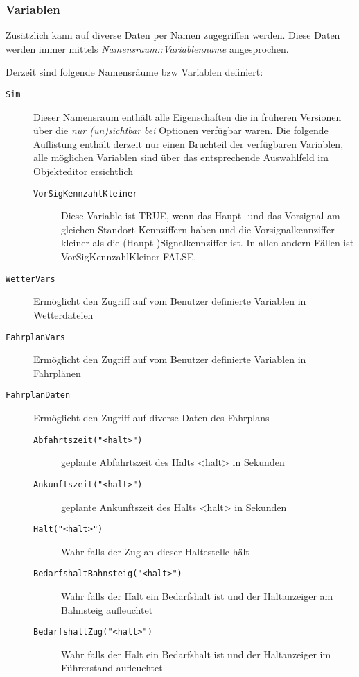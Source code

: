 \subsubsection{Variablen}
\label{sec:editor-obj-logischeausdruecke-vars}

Zusätzlich kann auf diverse Daten per Namen zugegriffen werden. Diese
Daten werden immer mittels \emph{Namensraum::Variablenname}
angesprochen.

Derzeit sind folgende Namensräume bzw Variablen definiert:

\begin{description}
\item[\texttt{Sim}]
Dieser Namensraum enthält alle Eigenschaften die in früheren Versionen über die \emph{nur (un)sichtbar bei} Optionen verfügbar waren.
Die folgende Auflistung enthält derzeit nur einen Bruchteil der verfügbaren Variablen, alle möglichen Variablen sind über das entsprechende Auswahlfeld im Objekteditor ersichtlich
\begin{description}
\item[\texttt{VorSigKennzahlKleiner}]
Diese Variable ist TRUE, wenn das Haupt- und das Vorsignal am gleichen Standort Kennziffern haben und die Vorsignalkennziffer kleiner als die (Haupt-)Signalkennziffer ist. In allen andern Fällen ist VorSigKennzahlKleiner FALSE.
\end{description}


\item[\texttt{WetterVars}]
Ermöglicht den Zugriff auf vom Benutzer definierte Variablen in
Wetterdateien
\item[\texttt{FahrplanVars}]
Ermöglicht den Zugriff auf vom Benutzer definierte Variablen in
Fahrplänen
\item[\texttt{FahrplanDaten}]
Ermöglicht den Zugriff auf diverse Daten des Fahrplans

\begin{description}
\item[\texttt{Abfahrtszeit("\textless{}halt\textgreater{}")}]
geplante Abfahrtszeit des Halts \textless{}halt\textgreater{} in
Sekunden
\item[\texttt{Ankunftszeit("\textless{}halt\textgreater{}")}]
geplante Ankunftszeit des Halts \textless{}halt\textgreater{} in
Sekunden
\item[\texttt{Halt("\textless{}halt\textgreater{}")}]
Wahr falls der Zug an dieser Haltestelle hält
\item[\texttt{BedarfshaltBahnsteig("\textless{}halt\textgreater{}")}]
Wahr falls der Halt ein Bedarfshalt ist und der Haltanzeiger am Bahnsteig aufleuchtet
\item[\texttt{BedarfshaltZug("\textless{}halt\textgreater{}")}]
Wahr falls der Halt ein Bedarfshalt ist und der Haltanzeiger im Führerstand aufleuchtet


\end{description}
\end{description}
